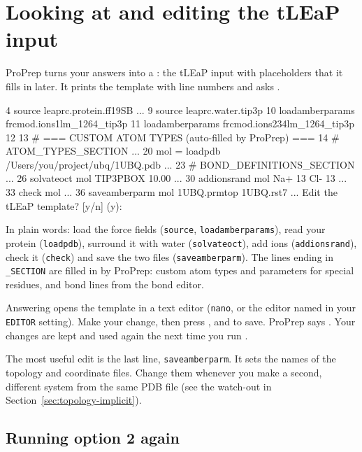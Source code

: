 \section{Looking at and editing the tLEaP input}\label{sec:topology-edit}

ProPrep turns your answers into a : the tLEaP input with
placeholders that it fills in later. It prints the template with line numbers
and asks .

\begin{screen}
   4 source leaprc.protein.ff19SB
...
   9 source leaprc.water.tip3p
  10 loadamberparams frcmod.ions1lm_1264_tip3p
  11 loadamberparams frcmod.ions234lm_1264_tip3p
  12
  13 # === CUSTOM ATOM TYPES (auto-filled by ProPrep) ===
  14 # ATOM_TYPES_SECTION
...
  20 mol = loadpdb /Users/you/project/ubq/1UBQ.pdb
...
  23 # BOND_DEFINITIONS_SECTION
...
  26 solvateoct mol TIP3PBOX 10.00
...
  30 addionsrand mol Na+ 13 Cl- 13
...
  33 check mol
...
  36 saveamberparm mol 1UBQ.prmtop 1UBQ.rst7
...
Edit the tLEaP template? [y/n] (y):
\end{screen}

In plain words: load the force fields (\texttt{source},
\texttt{loadamberparams}), read your protein (\texttt{loadpdb}), surround it
with water (\texttt{solvateoct}), add ions (\texttt{addionsrand}), check it
(\texttt{check}) and save the two files (\texttt{saveamberparm}). The lines
ending in \texttt{\_SECTION} are filled in by ProPrep: custom atom types and
parameters for special residues, and bond lines from the bond editor.

Answering  opens the template in a text editor (\texttt{nano}, or the
editor named in your \texttt{EDITOR} setting). Make your change, then press
,  and  to save. ProPrep says
. Your changes are kept and used again
the next time you run .

\begin{tip}
The most useful edit is the last line, \texttt{saveamberparm}. It sets the
names of the topology and coordinate files. Change them whenever you make a
second, different system from the same PDB file (see the watch-out in
Section~\ref{sec:topology-implicit}).
\end{tip}

\subsection{Running option 2 again}

